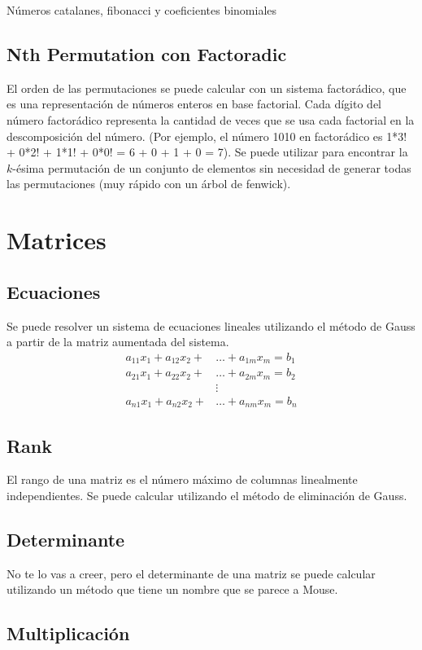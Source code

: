 Números catalanes, fibonacci y coeficientes binomiales

\subsection{Nth Permutation con Factoradic}
El orden de las permutaciones se puede calcular con un sistema factorádico, que
es una representación de números enteros en base factorial. Cada dígito del
número factorádico representa la cantidad de veces que se usa cada
factorial en la descomposición del número. (Por ejemplo, el número 1010 en
factorádico es 1*3! + 0*2! + 1*1! + 0*0! = 6 + 0 + 1 + 0 = 7). Se puede
utilizar para encontrar la $k$-ésima permutación de un conjunto de elementos
sin necesidad de generar todas las permutaciones (muy rápido con un árbol de
fenwick).


\section{Matrices}
\subsection{Ecuaciones}
Se puede resolver un sistema de ecuaciones lineales utilizando el método de Gauss
a partir de la matriz aumentada del sistema.
\begin{align}
a_{11} x_1 + a_{12} x_2 + &\dots + a_{1m} x_m = b_1 \\
a_{21} x_1 + a_{22} x_2 + &\dots + a_{2m} x_m = b_2\\
&\vdots \\
a_{n1} x_1 + a_{n2} x_2 + &\dots + a_{nm} x_m = b_n
\end{align}


\subsection{Rank}
El rango de una matriz es el número máximo de columnas linealmente
independientes. Se puede calcular utilizando el método de eliminación de Gauss.

\subsection{Determinante}
No te lo vas a creer, pero el determinante de una matriz se puede calcular
utilizando un método que tiene un nombre que se parece a Mouse.

\subsection{Multiplicación}

